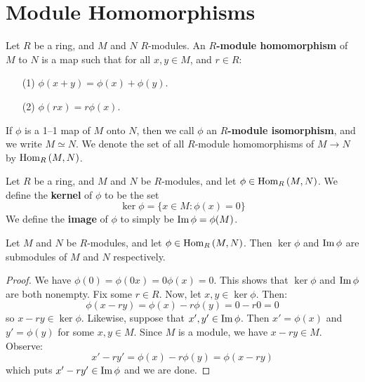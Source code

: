 \section{Module Homomorphisms}

\begin{definition}
  Let $R$ be a ring, and $M$ and  $N$  $R$-modules. An
  \textbf{$R$-module homomorphism} of $M$ to $N$ is a map such that
  for all $x,y \in M$, and $r \in R$:
  \begin{enumerate}
    \item[(1)] $\phi(x+y)=\phi(x)+\phi(y)$.

    \item[(2)] $\phi(rx)=r\phi(x)$.
  \end{enumerate}
  If $\phi$ is a 1--1 map of $M$ onto $N$, then we call  $\phi$ an
  \textbf{$R$-module isomorphism}, and we write $M \simeq N$. We
  denote the set of all $R$-module homomorphisms of  $M \xrightarrow{}
  N$ by $\operatorname{Hom}_R{(M,N)}$.
\end{definition}

\begin{definition}
  Let $R$ be a ring, and $M$ and $N$ be $R$-modules, and let $\phi \in
  \operatorname{Hom}_R{(M,N)}$. We define the \textbf{kernel} of $\phi$ to be the
  set
  \begin{equation*}
    \ker{\phi}=\{ x \in M : \phi(x)=0 \}
  \end{equation*}
  We define the \textbf{image} of $\phi$ to simply be
  $\operatorname{Im}{\phi}=\phi(M)$.
\end{definition}

\begin{proposition}\label{label_4.2.1}
  Let $M$ and $N$ be $R$-modules, and let  $\phi \in \operatorname{Hom}_R{(M,N)}$.
  Then $\ker{\phi}$ and $\operatorname{Im}{\phi}$ are submodules
  of $M$ and $N$ respectively.
\end{proposition}
\begin{proof}
  We have $\phi(0)=\phi(0x)=0\phi(x)=0$. This shows that $\ker{\phi}$
  and $\operatorname{Im}{\phi}$ are both nonempty. Fix some $r \in R$. Now,
  let $x,y \in \ker{\phi}$. Then:
  \begin{equation*}
    \phi(x-ry)=\phi(x)-r\phi(y)=0-r0=0
  \end{equation*}
  so $x-ry \in \ker{\phi}$. Likewise, suppose that $x', y' \in
  \operatorname{Im}{\phi}$. Then $x'=\phi(x)$ and $y'=\phi(y)$ for some $x,y \in M$.
  Since $M$ is a module, we have $x-ry \in M$. Observe:
  \begin{equation*}
    x'-ry'=\phi(x)-r\phi(y)=\phi(x-ry)
  \end{equation*}
  which puts $x'-ry' \in \operatorname{Im}{\phi}$ and we are done.
\end{proof}

